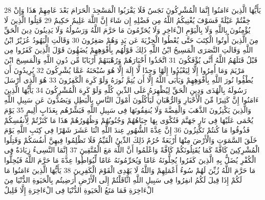 \documentclass[20pt,a4paper]{article}
\begin{document}
{\tiny\colorbox{cl_aya}{28}} يَأَيُّهَا الَّذِينَ ءَامَنُوا إِنَّمَا الْمُشْرِكُونَ نَجَسٌ فَلَا يَقْرَبُوا الْمَسْجِدَ الْحَرَامَ بَعْدَ عَامِهِمْ هَذَا وَإِنْ خِفْتُمْ عَيْلَةً فَسَوْفَ يُغْنِيكُمُ اللَّهُ مِن فَضْلِهِ إِن شَاءَ إِنَّ اللَّهَ عَلِيمٌ حَكِيمٌ
{\tiny\colorbox{cl_aya}{29}} قَتِلُوا الَّذِينَ لَا يُؤْمِنُونَ بِاللَّهِ وَلَا بِالْيَوْمِ الْءَاخِرِ وَلَا يُحَرِّمُونَ مَا حَرَّمَ اللَّهُ وَرَسُولُهُ وَلَا يَدِينُونَ دِينَ الْحَقِّ مِنَ الَّذِينَ أُوتُوا الْكِتَبَ حَتَّى يُعْطُوا الْجِزْيَةَ عَن يَدٍ وَهُمْ صَغِرُونَ
{\tiny\colorbox{cl_aya}{30}} وَقَالَتِ الْيَهُودُ عُزَيْرٌ ابْنُ اللَّهِ وَقَالَتِ النَّصَرَى الْمَسِيحُ ابْنُ اللَّهِ ذَلِكَ قَوْلُهُم بِأَفْوَهِهِمْ يُضَهُِٔونَ قَوْلَ الَّذِينَ كَفَرُوا مِن قَبْلُ قَتَلَهُمُ اللَّهُ أَنَّى يُؤْفَكُونَ
{\tiny\colorbox{cl_aya}{31}} اتَّخَذُوا أَحْبَارَهُمْ وَرُهْبَنَهُمْ أَرْبَابًا مِّن دُونِ اللَّهِ وَالْمَسِيحَ ابْنَ مَرْيَمَ وَمَا أُمِرُوا إِلَّا لِيَعْبُدُوا إِلَهًا وَحِدًا لَّا إِلَهَ إِلَّا هُوَ سُبْحَنَهُ عَمَّا يُشْرِكُونَ
{\tiny\colorbox{cl_aya}{32}} يُرِيدُونَ أَن يُطْفُِٔوا نُورَ اللَّهِ بِأَفْوَهِهِمْ وَيَأْبَى اللَّهُ إِلَّا أَن يُتِمَّ نُورَهُ وَلَوْ كَرِهَ الْكَفِرُونَ
{\tiny\colorbox{cl_aya}{33}} هُوَ الَّذِى أَرْسَلَ رَسُولَهُ بِالْهُدَى وَدِينِ الْحَقِّ لِيُظْهِرَهُ عَلَى الدِّينِ كُلِّهِ وَلَوْ كَرِهَ الْمُشْرِكُونَ
{\tiny\colorbox{cl_aya}{34}} يَأَيُّهَا الَّذِينَ ءَامَنُوا إِنَّ كَثِيرًا مِّنَ الْأَحْبَارِ وَالرُّهْبَانِ لَيَأْكُلُونَ أَمْوَلَ النَّاسِ بِالْبَطِلِ وَيَصُدُّونَ عَن سَبِيلِ اللَّهِ وَالَّذِينَ يَكْنِزُونَ الذَّهَبَ وَالْفِضَّةَ وَلَا يُنفِقُونَهَا فِى سَبِيلِ اللَّهِ فَبَشِّرْهُم بِعَذَابٍ أَلِيمٍ
{\tiny\colorbox{cl_aya}{35}} يَوْمَ يُحْمَى عَلَيْهَا فِى نَارِ جَهَنَّمَ فَتُكْوَى بِهَا جِبَاهُهُمْ وَجُنُوبُهُمْ وَظُهُورُهُمْ هَذَا مَا كَنَزْتُمْ لِأَنفُسِكُمْ فَذُوقُوا مَا كُنتُمْ تَكْنِزُونَ
{\tiny\colorbox{cl_aya}{36}} إِنَّ عِدَّةَ الشُّهُورِ عِندَ اللَّهِ اثْنَا عَشَرَ شَهْرًا فِى كِتَبِ اللَّهِ يَوْمَ خَلَقَ السَّمَوَتِ وَالْأَرْضَ مِنْهَا أَرْبَعَةٌ حُرُمٌ ذَلِكَ الدِّينُ الْقَيِّمُ فَلَا تَظْلِمُوا فِيهِنَّ أَنفُسَكُمْ وَقَتِلُوا الْمُشْرِكِينَ كَافَّةً كَمَا يُقَتِلُونَكُمْ كَافَّةً وَاعْلَمُوا أَنَّ اللَّهَ مَعَ الْمُتَّقِينَ
{\tiny\colorbox{cl_aya}{37}} إِنَّمَا النَّسِىءُ زِيَادَةٌ فِى الْكُفْرِ يُضَلُّ بِهِ الَّذِينَ كَفَرُوا يُحِلُّونَهُ عَامًا وَيُحَرِّمُونَهُ عَامًا لِّيُوَاطُِٔوا عِدَّةَ مَا حَرَّمَ اللَّهُ فَيُحِلُّوا مَا حَرَّمَ اللَّهُ زُيِّنَ لَهُمْ سُوءُ أَعْمَلِهِمْ وَاللَّهُ لَا يَهْدِى الْقَوْمَ الْكَفِرِينَ
{\tiny\colorbox{cl_aya}{38}} يَأَيُّهَا الَّذِينَ ءَامَنُوا مَا لَكُمْ إِذَا قِيلَ لَكُمُ انفِرُوا فِى سَبِيلِ اللَّهِ اثَّاقَلْتُمْ إِلَى الْأَرْضِ أَرَضِيتُم بِالْحَيَوةِ الدُّنْيَا مِنَ الْءَاخِرَةِ فَمَا مَتَعُ الْحَيَوةِ الدُّنْيَا فِى الْءَاخِرَةِ إِلَّا قَلِيلٌ
\end{document}
